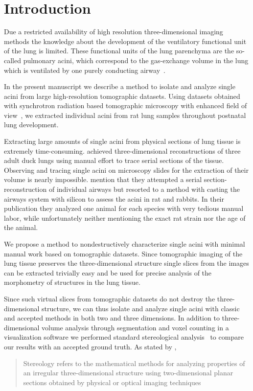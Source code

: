 \documentclass[%
	twoside,
	paper=a4,%
	abstract=true,%
	]{scrartcl}
\begin{document}
\clearpage
\section{Introduction}
Due a restricted availability of high resolution three-dimensional imaging methods the knowledge about the development of the ventilatory functional unit of the lung is limited. These functional units of the lung parenchyma are the so-called pulmonary acini, which correspond to the gas-exchange volume in the lung which is ventilated by one purely conducting airway~\cite{Rodriguez1987}.

In the present manuscript we describe a method to isolate and analyze single acini from large high-resolution tomographic datasets. Using datasets obtained with synchrotron radiation based tomographic microscopy with enhanced field of view~\cite{Haberthuer2010a}, we extracted individual acini from rat lung samples throughout postnatal lung development. 

Extracting large amounts of single acini from physical sections of lung tissue is extremely time-consuming. \citet{Woodward2005} achieved three-dimensional reconstructions of three adult duck lungs using manual effort to trace serial sections of the tissue. Observing and tracing single acini on microscopy slides for the extraction of their volume is nearly impossible. \citet{Rodriguez1987} mention that they attempted a serial section-reconstruction of individual airways but resorted to a method with casting the airways system with silicon to assess the acini in rat and rabbits. In their publication they analyzed one animal for each species with very tedious manual labor, while unfortunately neither mentioning the exact rat strain nor the age of the animal.

We propose a method to nondestructively characterize single acini with minimal manual work based on tomographic datasets. Since tomographic imaging of the lung tissue preserves the three-dimensional structure single slices from the images can be extracted trivially easy and be used for precise analysis of the morphometry of structures in the lung tissue.

Since such virtual slices from tomographic datasets do not destroy the three-dimensional structure, we can thus isolate and analyze single acini with classic and accepted methods in both two and three dimensions. In addition to three-dimensional volume analysis through segmentation and voxel counting in a visualization software we performed standard stereological analysis~\cite{Hsia2010} to compare our results with an accepted ground truth. As stated by \citet{Hsia2010}, \blockquote{Stereology refers to the mathematical methods for analyzing properties of an irregular three-dimensional structure using two-dimensional planar sections obtained by physical or optical imaging techniques}.
\end{document}
